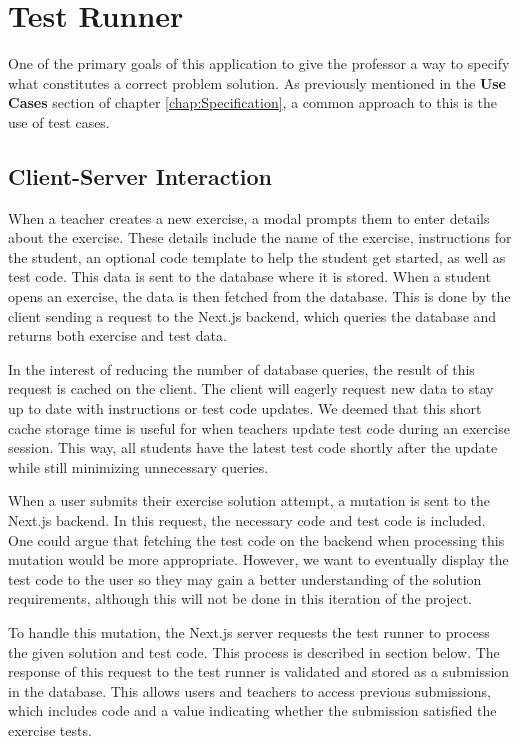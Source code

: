 \chapter{Test Runner} \label{chap:TestRunner}
One of the primary goals of this application to give the professor a way to specify what constitutes a correct problem solution.
As previously mentioned in the \textbf{Use Cases} section of chapter \ref{chap:Specification}, a common approach to this is the use of test cases.

\section{Client-Server Interaction}
When a teacher creates a new exercise, a modal prompts them to enter details about the exercise.
These details include the name of the exercise, instructions for the student, an optional code template to help the student get started, as well as test code.
This data is sent to the database where it is stored.
When a student opens an exercise, the data is then fetched from the database.
This is done by the client sending a request to the Next.js backend, which queries the database and returns both exercise and test data.

In the interest of reducing the number of database queries, the result of this request is cached on the client. 
The client will eagerly request new data to stay up to date with instructions or test code updates.
We deemed that this short cache storage time is useful for when teachers update test code during an exercise session.
This way, all students have the latest test code shortly after the update while still minimizing unnecessary queries.

When a user submits their exercise solution attempt, a mutation is sent to the Next.js backend.
In this request, the necessary code and test code is included. 
One could argue that fetching the test code on the backend when processing this mutation would be more appropriate.
However, we want to eventually display the test code to the user so they may gain a better understanding of the solution requirements, although this will not be done in this iteration of the project.

To handle this mutation, the Next.js server requests the test runner to process the given solution and test code.
This process is described in section \label{sec:test_runner_process} below. 
The response of this request to the test runner is validated and stored as a submission in the database. 
This allows users and teachers to access previous submissions, which includes code and a value indicating whether the submission satisfied the exercise tests.


